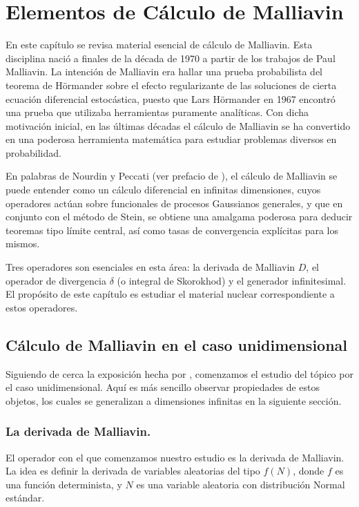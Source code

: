 \documentclass[letterpaper,twoside,12pt]{book}
\newcommand{\1}{\mathds{1}}
\theoremstyle{definition}
\theoremstyle{definition}
\theoremstyle{remark}
\theoremstyle{definition}
\theoremstyle{definition}
\theoremstyle{definition}
\theoremstyle{definition}
\theoremstyle{definition}
\begin{document}
\chapter{Elementos de Cálculo de Malliavin}%
En este capítulo se revisa material esencial de cálculo de Malliavin. Esta disciplina nació a finales de la década de 1970 a partir de los trabajos de Paul Malliavin. La intención de Malliavin era hallar una prueba probabilista del teorema de Hörmander sobre el efecto regularizante de las soluciones de cierta ecuación diferencial estocástica, puesto que Lars Hörmander en 1967 encontró una prueba que utilizaba herramientas puramente analíticas. Con dicha motivación inicial, en las últimas décadas el cálculo de Malliavin se ha convertido en una poderosa herramienta matemática para estudiar problemas diversos en probabilidad. 

En palabras de Nourdin y Peccati (ver prefacio de \cite{Nourdin_Peccati_2012}), el cálculo de Malliavin se puede entender como un cálculo diferencial en infinitas dimensiones, cuyos operadores actúan sobre funcionales de procesos Gaussianos generales, y que en conjunto con el método de Stein, se obtiene una amalgama poderosa para deducir teoremas tipo límite central, así como tasas de convergencia explícitas para los mismos. 

Tres operadores son esenciales en esta área: la derivada de Malliavin $D$, el operador de divergencia $\delta$ (o integral de Skorokhod) y el generador infinitesimal. El propósito de este capítulo es estudiar el material nuclear correspondiente a estos operadores.
\section{Cálculo de Malliavin en el caso unidimensional}
Siguiendo de cerca la exposición hecha por \cite{Nourdin_Peccati_2012}, comenzamos el estudio del tópico por el caso unidimensional. Aquí es más sencillo observar propiedades de estos objetos, los cuales se generalizan a dimensiones infinitas en la siguiente sección.

\subsection{La derivada de Malliavin.}

El operador con el que comenzamos nuestro estudio es la derivada de Malliavin. La idea es definir la derivada de variables aleatorias del tipo $f(N)$, donde $f$ es una función determinista, y $N$ es una variable aleatoria con distribución Normal estándar.
\end{document}
